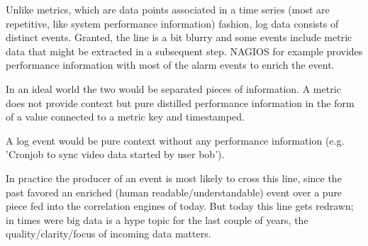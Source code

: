 Unlike metrics, which are data points associated in a time series (most are repetitive, like system performance information)
fashion, log data consists of distinct events. Granted, the line is a bit blurry and some events include metric data that
might be extracted in a subsequent step. NAGIOS for example provides performance information with most of the alarm events to enrich the event.

In an ideal world the two would be separated pieces of information. A metric does not provide context
but pure distilled performance information in the form of a value connected to a metric key and timestamped.

A log event would be pure context without any performance information (e.g. 'Cronjob to sync video data started by user bob'). 

In practice the producer of an event is most likely to cross this line, since the past favored an enriched (human readable/understandable) event over a
pure piece fed into the correlation engines of today. But today this line gets redrawn; in times were big data is a hype topic for the last couple
of years, the quality/clarity/focus of incoming data matters.
